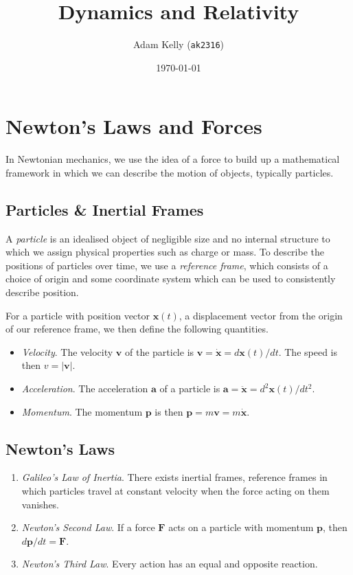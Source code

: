 \documentclass[11pt, a4paper]{scrartcl}
\title{Dynamics and Relativity}
\author{Adam Kelly (\texttt{ak2316})}
\date{\today}
\newcommand{\vv}[1]{\boldsymbol{\mathbf{#1}}}
\theoremstyle{definition}
\begin{document}
\maketitle  


\section{Newton's Laws and Forces}


In Newtonian mechanics, we use the idea of a force to build up a mathematical framework in which we can describe the motion of objects, typically particles.

\subsection*{Particles \& Inertial Frames}

A \emph{particle} is an idealised object of negligible size and no internal structure to which we assign physical properties such as charge or mass.
To describe the positions of particles over time, we use a \emph{reference frame}, which consists of a choice of origin and some coordinate system which can be used to consistently describe position.

For a particle with position vector $\vv x(t)$, a displacement vector from the origin of our reference frame, we then define the following quantities.
\begin{itemize}
	\item \emph{Velocity}. The velocity $\vv v$ of the particle is $\vv v = \dot{\vv x} = d \vv x(t) / dt$. The speed is then $v = |\vv v|$.
	\item \emph{Acceleration}. The acceleration $\vv a$ of a particle is $\vv a = \ddot{\vv x} = d^2 \vv x(t)/dt^2$.
	\item \emph{Momentum}. The momentum $\vv p$ is then $\vv p = m \vv v = m \dot{\vv x}$.
\end{itemize}


\subsection*{Newton's Laws}

\begin{enumerate}
	\item \emph{Galileo's Law of Inertia}. There exists inertial frames, reference frames in which particles travel at constant velocity when the force acting on them vanishes.
	\item \emph{Newton's Second Law}. If a force $\vv F$ acts on a particle with momentum $\vv p$, then $d\vv p/dt = \vv F$.
	\item \emph{Newton's Third Law}. Every action has an equal and opposite reaction.
\end{enumerate}
\end{document}
